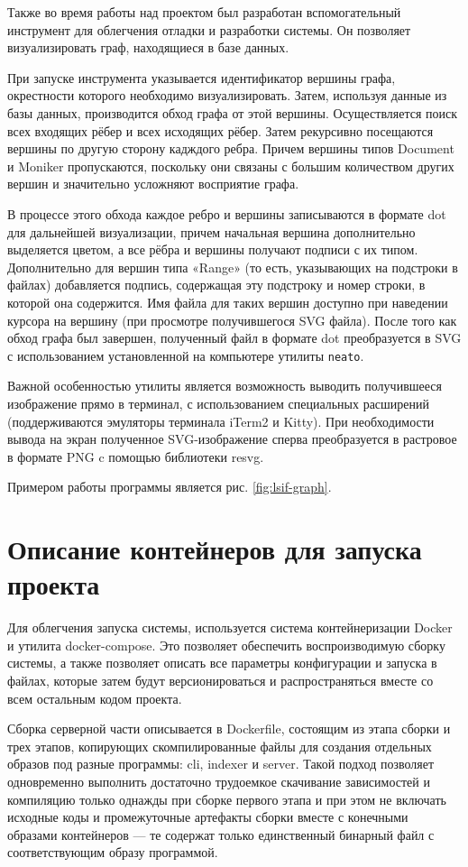 Также во время работы над проектом был разработан вспомогательный инструмент для облегчения отладки и разработки системы. Он позволяет визуализировать граф, находящиеся в базе данных.

При запуске инструмента указывается идентификатор вершины графа, окрестности которого необходимо визуализировать. Затем, используя данные из базы данных, производится обход графа от этой вершины. Осуществляется поиск всех входящих рёбер и всех исходящих рёбер. Затем рекурсивно посещаются вершины по другую сторону кадждого ребра. Причем вершины типов Document и Moniker пропускаются, поскольку они связаны с большим количеством других вершин и значительно усложняют восприятие графа.

В процессе этого обхода каждое ребро и вершины записываются в формате dot для дальнейшей визуализации, причем начальная вершина дополнительно выделяется цветом, а все рёбра и вершины получают подписи с их типом. Дополнительно для вершин типа «Range» (то есть, указывающих на подстроки в файлах) добавляется подпись, содержащая эту подстроку и номер строки, в которой она содержится. Имя файла для таких вершин доступно при наведении курсора на вершину (при просмотре получившегося SVG файла).  После того как обход графа был завершен, полученный файл в формате dot преобразуется в SVG с использованием установленной на компьютере утилиты \texttt{neato}.

Важной особенностью утилиты является возможность выводить получившееся изображение прямо в терминал, с использованием специальных расширений (поддерживаются эмуляторы терминала iTerm2 и Kitty). При необходимости вывода на экран полученное SVG-изображение сперва преобразуется в растровое в формате PNG c помощью библиотеки resvg.

Примером работы программы является рис. \ref{fig:lsif-graph}.

\section{Описание контейнеров для запуска проекта}

Для облегчения запуска системы, используется система контейнеризации Docker и утилита docker-compose. Это позволяет обеспечить воспроизводимую сборку системы, а также позволяет описать все параметры конфигурации  и запуска в файлах, которые затем будут версионироваться и распространяться вместе со всем остальным кодом проекта.

Сборка серверной части описывается в Dockerfile, состоящим из этапа сборки и трех этапов, копирующих скомпилированные файлы для создания отдельных образов под разные программы: cli, indexer и server. Такой подход позволяет одновременно выполнить достаточно трудоемкое скачивание зависимостей и компиляцию только однажды при сборке первого этапа и при этом не включать исходные коды и промежуточные артефакты сборки вместе с конечными образами контейнеров — те содержат только единственный бинарный файл с соответствующим образу программой.

